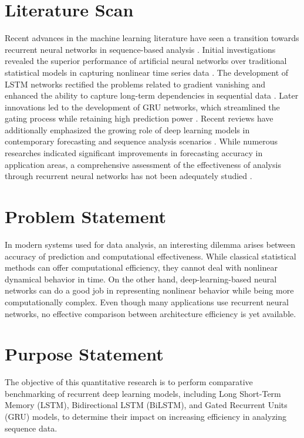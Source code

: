 \documentclass[12pt]{report}
\begin{document}
\section{Literature Scan}

Recent advances in the machine learning literature have seen a transition towards recurrent neural networks in sequence-based analysis \cite{goodfellow2016, lecun2015}. Initial investigations revealed the superior performance of artificial neural networks over traditional statistical models in capturing nonlinear time series data \cite{zhang1998, rumelhart1986}. The development of LSTM networks rectified the problems related to gradient vanishing and enhanced the ability to capture long-term dependencies in sequential data \cite{hochreiter1997}. Later innovations led to the development of GRU networks, which streamlined the gating process while retaining high prediction power \cite{cho2014}. Recent reviews have additionally emphasized the growing role of deep learning models in contemporary forecasting and sequence analysis scenarios \cite{lim2021, wen2022}. While numerous researches indicated significant improvements in forecasting accuracy in application areas, a comprehensive assessment of the effectiveness of analysis through recurrent neural networks has not been adequately studied \cite{kong2017, marino2016, smyl2020}.


\section{Problem Statement}

In modern systems used for data analysis, an interesting dilemma arises between accuracy of prediction and computational effectiveness. While classical statistical methods can offer computational efficiency, they cannot deal with nonlinear dynamical behavior in time. On the other hand, deep-learning-based neural networks can do a good job in representing nonlinear behavior while being more computationally complex. Even though many applications use recurrent neural networks, no effective comparison between architecture efficiency is yet available.


\section{Purpose Statement}

The objective of this quantitative research is to perform comparative benchmarking of recurrent deep learning models, including Long Short-Term Memory (LSTM), Bidirectional LSTM (BiLSTM), and Gated Recurrent Units (GRU) models, to determine their impact on increasing efficiency in analyzing sequence data.
\end{document}
